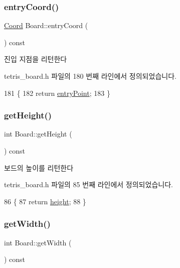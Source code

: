 \subsubsection{\texorpdfstring{entry\+Coord()}{entryCoord()}}
{\footnotesize\ttfamily \mbox{\hyperlink{struct_coord}{Coord}} Board\+::entry\+Coord (\begin{DoxyParamCaption}{ }\end{DoxyParamCaption}) const\hspace{0.3cm}{\ttfamily [inline]}}



진입 지점을 리턴한다 



tetris\+\_\+board.\+h 파일의 180 번째 라인에서 정의되었습니다.


\begin{DoxyCode}
181     \{
182         \textcolor{keywordflow}{return} \mbox{\hyperlink{class_board_a51d0b870dfe79367034bdda967e63a82}{entryPoint}};
183     \}
\end{DoxyCode}
\mbox{\label{class_board_a888725ae3b1177a60a8f77299c1c939a}} 
\subsubsection{\texorpdfstring{get\+Height()}{getHeight()}}
{\footnotesize\ttfamily int Board\+::get\+Height (\begin{DoxyParamCaption}{ }\end{DoxyParamCaption}) const\hspace{0.3cm}{\ttfamily [inline]}}



보드의 높이를 리턴한다 



tetris\+\_\+board.\+h 파일의 85 번째 라인에서 정의되었습니다.


\begin{DoxyCode}
86     \{
87         \textcolor{keywordflow}{return} \mbox{\hyperlink{class_board_a37b65287f3b416ed31b0f15cfd9b3f7c}{height}};
88     \}
\end{DoxyCode}
\mbox{\label{class_board_a31bdad2985e3b4857a383dd2da8e8e27}} 
\subsubsection{\texorpdfstring{get\+Width()}{getWidth()}}
{\footnotesize\ttfamily int Board\+::get\+Width (\begin{DoxyParamCaption}{ }\end{DoxyParamCaption}) const\hspace{0.3cm}{\ttfamily [inline]}}




